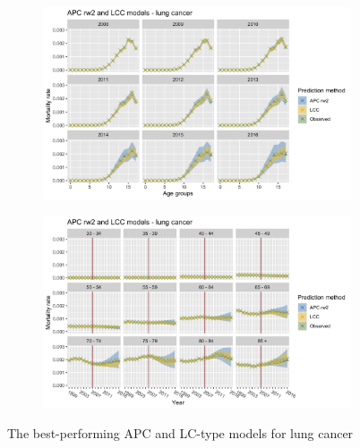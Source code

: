 \begin{figure}[h!]
    \centering
    \begin{subfigure}[b]{.6\linewidth}
        \includegraphics[width=\linewidth]{real-data/real-data-univariate/Figures/univariate-comparison-by-age-lung.png}
    \end{subfigure}
    
    \begin{subfigure}[b]{.6\linewidth}
        \includegraphics[width=\linewidth]{real-data/real-data-univariate/Figures/univariate-comparison-by-period-lung.png}
    \end{subfigure}
    \caption{The best-performing APC and LC-type models for lung cancer}
    \label{fig:uv-comparison-lung}
\end{figure}

